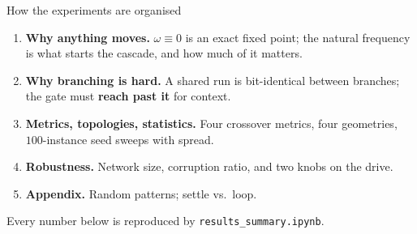 \documentclass[aspectratio=169]{beamer}
\begin{document}
\begin{frame}{How the experiments are organised}
  \begin{enumerate}
    \item \textbf{Why anything moves.} $\omega \equiv 0$ is an exact fixed point;
      the natural frequency is what starts the cascade, and how much of it matters.
    \item \textbf{Why branching is hard.} A shared run is bit-identical between
      branches; the gate must \textbf{reach past it} for {context}.
    \item \textbf{Metrics, topologies, statistics.} Four crossover metrics, four
      geometries, $100$-instance seed sweeps with spread.
    \item \textbf{Robustness.} Network size, corruption ratio, and two knobs on the drive.
    \item \textbf{Appendix.} Random patterns; settle vs.\ loop.
  \end{enumerate}
  \vspace{2mm}
  {\small Every number below is reproduced by \texttt{results\_summary.ipynb}.}
\end{frame}
\end{document}
